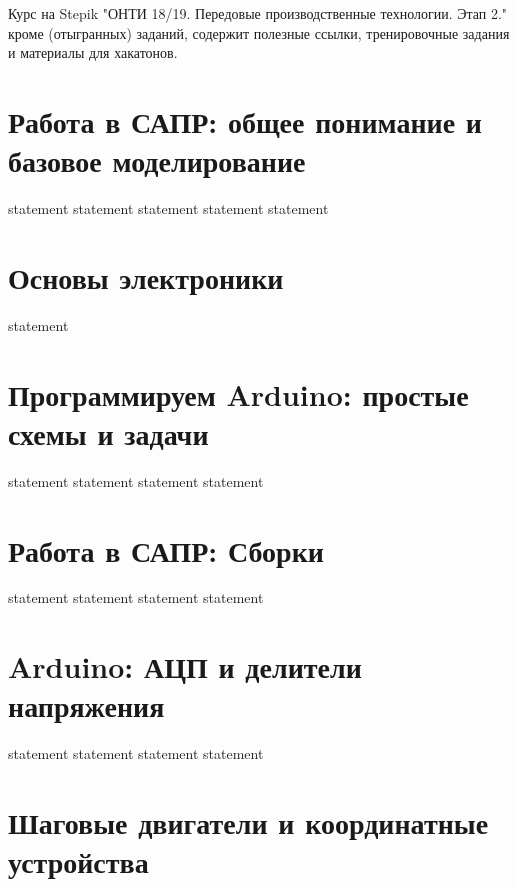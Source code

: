 Курс на Stepik "ОНТИ 18/19. Передовые производственные технологии. Этап 2." кроме (отыгранных) заданий, содержит полезные ссылки, тренировочные задания и материалы для хакатонов. 

\section{Работа в САПР: общее понимание и базовое моделирование}

{statement}
{statement}
{statement}
{statement}
{statement}

\section{Основы электроники}

{statement}

\section{Программируем Arduino: простые схемы и задачи}

{statement}
{statement}
{statement}
{statement}

\section{Работа в САПР: Сборки}

{statement}
{statement}
{statement}
{statement}

\section{Arduino: АЦП и делители напряжения}

{statement}
{statement}
{statement}
{statement}

\section{Шаговые двигатели и координатные устройства}

